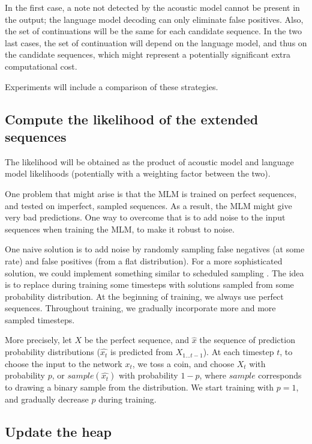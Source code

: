 \documentclass{article}
\begin{document}
In the first case, a note not detected by the acoustic model cannot be present in the output; the language model decoding can only eliminate false positives.
Also, the set of continuations will be the same for each candidate sequence.
In the two last cases, the set of continuation will depend on the language model, and thus on the candidate sequences, which might represent a potentially significant extra computational cost.

Experiments will include a comparison of these strategies.

\subsection{Compute the likelihood of the extended sequences}
\label{sec:schedsamp}

The likelihood will be obtained as the product of acoustic model and language model likelihoods (potentially with a weighting factor between the two).

One problem that might arise is that the MLM is trained on perfect sequences, and tested on imperfect, sampled sequences.
As a result, the MLM might give very bad predictions.
One way to overcome that is to add noise to the input sequences when training the MLM, to make it robust to noise.

One naive solution is to add noise by randomly sampling false negatives (at some rate) and false positives (from a flat distribution).
For a more sophisticated solution, we could implement something similar to scheduled sampling  \cite{Bengio2015}.
The idea is to replace during training some timesteps with solutions sampled from some probability distribution.
At the beginning of training, we always use perfect sequences.
Throughout training, we gradually incorporate more and more sampled timesteps.

More precisely, let $X$ be the perfect sequence, and $\hat{x}$ the sequence of prediction probability distributions
($\hat{x_t}$ is predicted from $X_{1...t-1}$).
At each timestep $t$, to choose the input to the network $x_t$, we toss a coin,
and choose $X_t$ with probability $p$, or $sample(\hat{x_t})$ with probability $1-p$, where $sample$ corresponds to drawing a binary sample from the distribution.
We start training with $p=1$, and gradually decrease $p$ during training.



\subsection{Update the heap}
\label{sec:update}
\end{document}
